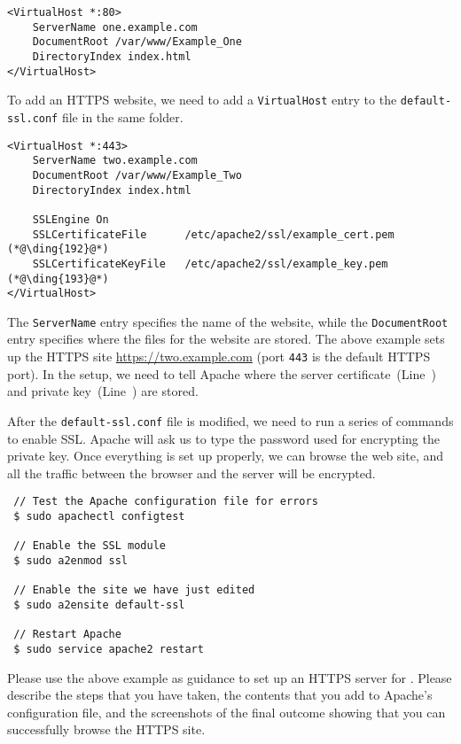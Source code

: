 \begin{lstlisting}
<VirtualHost *:80>
    ServerName one.example.com
    DocumentRoot /var/www/Example_One
    DirectoryIndex index.html
</VirtualHost>
\end{lstlisting}

To add an HTTPS website, we need to add a \texttt{VirtualHost}
entry to the \texttt{default-ssl.conf} file in the same folder. 

\begin{lstlisting}
<VirtualHost *:443>
    ServerName two.example.com
    DocumentRoot /var/www/Example_Two
    DirectoryIndex index.html

    SSLEngine On
    SSLCertificateFile      /etc/apache2/ssl/example_cert.pem  (*@\ding{192}@*)
    SSLCertificateKeyFile   /etc/apache2/ssl/example_key.pem   (*@\ding{193}@*)
</VirtualHost>
\end{lstlisting}

The \texttt{ServerName} entry specifies the name of the website, while
the \texttt{DocumentRoot} entry specifies where the files for 
the website are stored. 
The above example sets up the HTTPS site \url{https://two.example.com} (port \texttt{443} 
is the default HTTPS port).  In the setup, we need to tell Apache where
the server certificate~(Line~) and private key~(Line~) are stored. 


After the \texttt{default-ssl.conf} file is modified, we need to run a series of commands 
to enable SSL.  Apache will ask us to type the password used
for encrypting the private key.
Once everything is set up properly, we can
browse the web site, and all the traffic between the browser and the server will be encrypted.

\begin{lstlisting}
 // Test the Apache configuration file for errors
 $ sudo apachectl configtest

 // Enable the SSL module 
 $ sudo a2enmod ssl

 // Enable the site we have just edited
 $ sudo a2ensite default-ssl

 // Restart Apache
 $ sudo service apache2 restart
\end{lstlisting}
 


Please use the above example as guidance to set up an HTTPS server for 
\pkiserver. Please describe the steps that 
you have taken, the contents that you add to Apache's configuration file, and 
the screenshots of the final outcome showing that you can successfully browse
the HTTPS site. 




